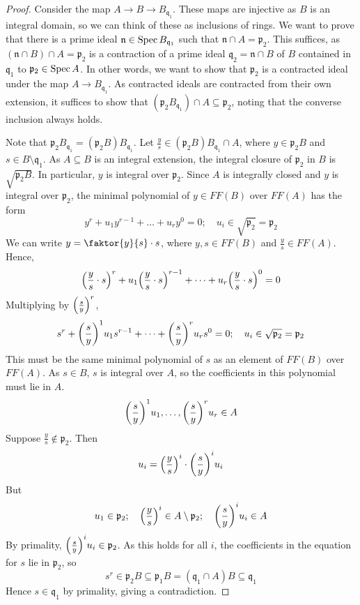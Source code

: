 \begin{proof}
    Consider the map \( A \to B \to B_{\mathfrak q_1} \).
    These maps are injective as \( B \) is an integral domain, so we can think of these as inclusions of rings.
    We want to prove that there is a prime ideal \( \mathfrak n \in \operatorname{Spec} B_{\mathfrak q_1} \) such that \( \mathfrak n \cap A = \mathfrak p_2 \).
    This suffices, as \( (\mathfrak n \cap B) \cap A = \mathfrak p_2 \) is a contraction of a prime ideal \( \mathfrak q_2 = \mathfrak n \cap B \) of \( B \) contained in \( \mathfrak q_1 \) to \( \mathfrak p_2 \in \operatorname{Spec} A \).
    In other words, we want to show that \( \mathfrak p_2 \) is a contracted ideal under the map \( A \to B_{\mathfrak q_1} \).
    As contracted ideals are contracted from their own extension, it suffices to show that \( (\mathfrak p_2 B_{\mathfrak q_1}) \cap A \subseteq \mathfrak p_2 \), noting that the converse inclusion always holds.

    Note that \( \mathfrak p_2 B_{\mathfrak q_1} = (\mathfrak p_2 B) B_{\mathfrak q_1} \).
    Let \( \frac{y}{s} \in (\mathfrak p_2 B) B_{\mathfrak q_1} \cap A \), where \( y \in \mathfrak p_2 B \) and \( s \in B \setminus \mathfrak q_1 \).
    As \( A \subseteq B \) is an integral extension, the integral closure of \( \mathfrak p_2 \) in \( B \) is \( \sqrt{\mathfrak p_2 B} \).
    In particular, \( y \) is integral over \( \mathfrak p_2 \).
    Since \( A \) is integrally closed and \( y \) is integral over \( \mathfrak p_2 \), the minimal polynomial of \( y \in FF(B) \) over \( FF(A) \) has the form
    \[ y^r + u_1 y^{r-1} + \dots + u_r y^0 = 0;\quad u_i \in \sqrt{\mathfrak p_2} = \mathfrak p_2 \]
    We can write \( y = \faktor{y}{s} \cdot s \), where \( y, s \in FF(B) \) and \( \frac{y}{s} \in FF(A) \).
    Hence,
    \[ \qty(\frac{y}{s} \cdot s)^r + u_1 \qty(\frac{y}{s} \cdot s)^{r-1} + \dots + u_r \qty(\frac{y}{s} \cdot s)^0 = 0 \]
    Multiplying by \( \qty(\frac{s}{y})^r \),
    \[ s^r + \qty(\frac{s}{y})^1 u_1 s^{r-1} + \dots + \qty(\frac{s}{y})^r u_r s^0 = 0;\quad u_i \in \sqrt{\mathfrak p_2} = \mathfrak p_2 \]
    This must be the same minimal polynomial of \( s \) as an element of \( FF(B) \) over \( FF(A) \).
    As \( s \in B \), \( s \) is integral over \( A \), so the coefficients in this polynomial must lie in \( A \).
    \[ \qty(\frac{s}{y})^1 u_1, \dots, \qty(\frac{s}{y})^r u_r \in A \]
    Suppose \( \frac{y}{s} \notin \mathfrak p_2 \).
    Then
    \[ u_i = \qty(\frac{y}{s})^i \cdot \qty(\frac{s}{y})^i u_i \]
    But
    \[ u_1 \in \mathfrak p_2;\quad \qty(\frac{y}{s})^i \in A \setminus \mathfrak p_2;\quad \qty(\frac{s}{y})^i u_i \in A \]
    By primality, \( \qty(\frac{s}{y})^i u_i \in \mathfrak p_2 \).
    As this holds for all \( i \), the coefficients in the equation for \( s \) lie in \( \mathfrak p_2 \), so
    \[ s^r \in \mathfrak p_2 B \subseteq \mathfrak p_1 B = (\mathfrak q_1 \cap A) B \subseteq \mathfrak q_1 \]
    Hence \( s \in \mathfrak q_1 \) by primality, giving a contradiction.
\end{proof}
